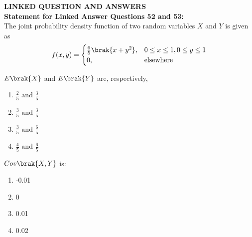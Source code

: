 \iffalse
\chapter{2012}
\author{EE24BTECH11059}
\section{ma}
\fi
\item[]{
	    \textbf{LINKED QUESTION AND ANSWERS}\\
\textbf{Statement for Linked Answer Questions 52 and 53:} \\
The joint probability density function of two random variables $X$ and $Y$ is given as
\[
f(x,y) = 
\begin{cases}
	\frac{6}{5}\brak{x+y^2}, & 0\leq x\leq 1,0\leq y\leq 1 \\
	0, & \text{elsewhere}
\end{cases}
\]}
	\item{
		$E\brak{X} $
		and
		$ E\brak{Y} $
		are, respectively,\text{  }\hfill
		
		\begin{multicols}{4}
			\begin{enumerate}
				\item $\frac{2}{5} \text{ and } \frac{3}{5}$
				
				\item $\frac{3}{5} \text{ and } \frac{3}{5}$
				
				\item $\frac{3}{5} \text{ and } \frac{6}{5}$
				
				\item $\frac{4}{5} \text{ and } \frac{6}{5}$
			\end{enumerate}
		\end{multicols}
	}
   	\item{
    	$Cov\brak{X,Y}$ is: \text{  }\hfill
    	
    	\begin{multicols}{4}
    		\begin{enumerate}
    			\item -0.01 
    			
    			\item 0
    			
    			\item 0.01 
    			
    			\item 0.02
    		\end{enumerate}
    	\end{multicols}
    }
